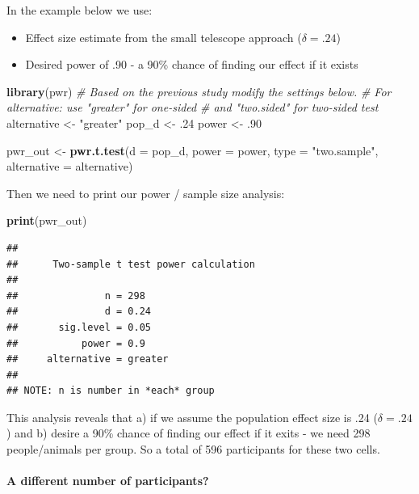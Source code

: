 \documentclass[
]{krantz}
\makeatletter
\newenvironment{Shaded}{\begin{snugshade}}{\end{snugshade}}
\newcommand{\CommentTok}[1]{\textcolor[rgb]{0.37,0.37,0.37}{\textit{#1}}}
\newcommand{\DataTypeTok}[1]{\textcolor[rgb]{0.27,0.27,0.27}{#1}}
\newcommand{\FloatTok}[1]{\textcolor[rgb]{0.06,0.06,0.06}{#1}}
\newcommand{\KeywordTok}[1]{\textcolor[rgb]{0.27,0.27,0.27}{\textbf{#1}}}
\newcommand{\NormalTok}[1]{#1}
\newcommand{\StringTok}[1]{\textcolor[rgb]{0.5,0.5,0.5}{#1}}
\newenvironment{kframe}{%
\medskip{}
\setlength{\fboxsep}{.8em}
 \def\at@end@of@kframe{}%
 \ifinner\ifhmode%
  \def\at@end@of@kframe{\end{minipage}}%
  \begin{minipage}{\columnwidth}%
 \fi\fi%
 \def\FrameCommand##1{\hskip\@totalleftmargin \hskip-\fboxsep
 \colorbox{shadecolor}{##1}\hskip-\fboxsep
     \hskip-\linewidth \hskip-\@totalleftmargin \hskip\columnwidth}%
 \MakeFramed {\advance\hsize-\width
   \@totalleftmargin\z@ \linewidth\hsize
   \@setminipage}}%
 {\par\unskip\endMakeFramed%
 \at@end@of@kframe}
\renewenvironment{Shaded}{\begin{kframe}}{\end{kframe}}
\makeatother
\begin{document}
In the example below we use:

\begin{itemize}
\item
  Effect size estimate from the small telescope approach (\(\delta = .24\))
\item
  Desired power of .90 - a 90\% chance of finding our effect if it exists
\end{itemize}

\begin{Shaded}
\begin{Highlighting}[]
\KeywordTok{library}\NormalTok{(pwr)}
\CommentTok{# Based on the previous study modify the settings below.}
\CommentTok{# For alternative: use "greater" for one-sided }
\CommentTok{# and "two.sided" for two-sided test}
\NormalTok{alternative <-}\StringTok{ "greater"}
\NormalTok{pop_d <-}\StringTok{ }\FloatTok{.24}
\NormalTok{power <-}\StringTok{ }\FloatTok{.90}

\NormalTok{pwr_out <-}\StringTok{ }\KeywordTok{pwr.t.test}\NormalTok{(}\DataTypeTok{d =}\NormalTok{ pop_d, }
                      \DataTypeTok{power =}\NormalTok{ power,}
                      \DataTypeTok{type =} \StringTok{"two.sample"}\NormalTok{,}
                      \DataTypeTok{alternative =}\NormalTok{ alternative)}
\end{Highlighting}
\end{Shaded}

Then we need to print our power / sample size analysis:

\begin{Shaded}
\begin{Highlighting}[]
\KeywordTok{print}\NormalTok{(pwr_out)}
\end{Highlighting}
\end{Shaded}

\begin{verbatim}
## 
##      Two-sample t test power calculation 
## 
##               n = 298
##               d = 0.24
##       sig.level = 0.05
##           power = 0.9
##     alternative = greater
## 
## NOTE: n is number in *each* group
\end{verbatim}

This analysis reveals that a) if we assume the population effect size is .24 (\(\delta = .24\)) and b) desire a 90\% chance of finding our effect if it exits - we need 298 people/animals per group. So a total of 596 participants for these two cells.

\hypertarget{a-different-number-of-participants}{%
\paragraph{A different number of participants?}\label{a-different-number-of-participants}}
\end{document}
